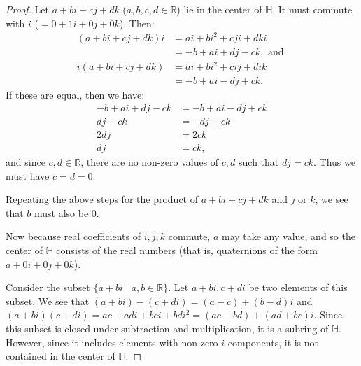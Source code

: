 \documentclass{article}
\begin{document}
\begin{proof}
    Let $a + bi + cj + dk$ ($a, b, c, d \in \mathbb{R}$) lie in the center of $\mathbb{H}$. It must commute with $i$ ($= 0 + 1i + 0j + 0k$). Then:
    \begin{align*}
        (a + bi + cj + dk)i &= ai + bi^2 + cji + dki \\
        &= -b + ai + dj - ck, \text{ and } \\
        i(a + bi + cj + dk) &= ai + bi^2 + cij + dik \\
        &= -b + ai - dj + ck.
    \end{align*}
    If these are equal, then we have:
    \begin{align*}
        -b + ai + dj - ck &= -b + ai - dj + ck \\
        dj - ck &= -dj + ck \\ 
        2dj &= 2ck \\
        dj &= ck,
    \end{align*}
    and since $c, d \in \mathbb{R}$, there are no non-zero values of $c, d$ such that $dj = ck$. Thus we must have $c = d = 0$.

    Repeating the above steps for the product of $a + bi + cj + dk$ and $j$ or $k$, we see that $b$ must also be 0.

    Now because real coefficients of $i, j, k$ commute, $a$ may take any value, and so the center of $\mathbb{H}$ consists of the real numbers (that is, quaternions of the form $a + 0i + 0j + 0k$).

    Consider the subset $\{ a + bi \mid a, b \in \mathbb{R} \}$. Let $a + bi, c + di$ be two elements of this subset. We see that $(a + bi) - (c + di) = (a - c) + (b - d)i$ and $(a + bi)(c + di) = ac + adi + bci + bdi^2 = (ac - bd) + (ad + bc)i$. Since this subset is closed under subtraction and multiplication, it is a subring of $\mathbb{H}$. However, since it includes elements with non-zero $i$ components, it is not contained in the center of $\mathbb{H}$.
\end{proof}
\end{document}
